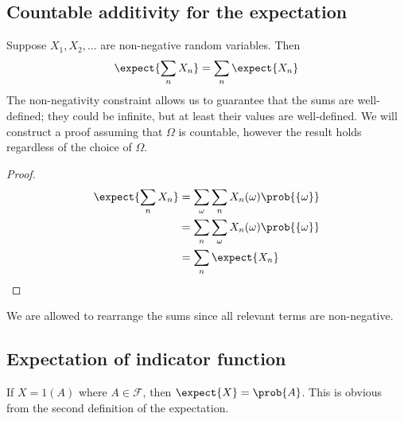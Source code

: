 \subsection{Countable additivity for the expectation}
Suppose \(X_1, X_2, \dots\) are non-negative random variables.
Then
\[
	\expect{\sum_n X_n} = \sum_n \expect{X_n}
\]
The non-negativity constraint allows us to guarantee that the sums are well-defined; they could be infinite, but at least their values are well-defined.
We will construct a proof assuming that \(\Omega\) is countable, however the result holds regardless of the choice of \(\Omega\).
\begin{proof}
	\begin{align*}
		\expect{\sum_n X_n} & = \sum_\omega \sum_n X_n(\omega) \prob{\{ \omega \}} \\
		                    & = \sum_n \sum_\omega X_n(\omega) \prob{\{ \omega \}} \\
		                    & = \sum_n \expect{X_n}
	\end{align*}
\end{proof}
We are allowed to rearrange the sums since all relevant terms are non-negative.

\subsection{Expectation of indicator function}
If \(X = 1(A)\) where \(A \in \mathcal F\), then \(\expect{X} = \prob{A}\).
This is obvious from the second definition of the expectation.

